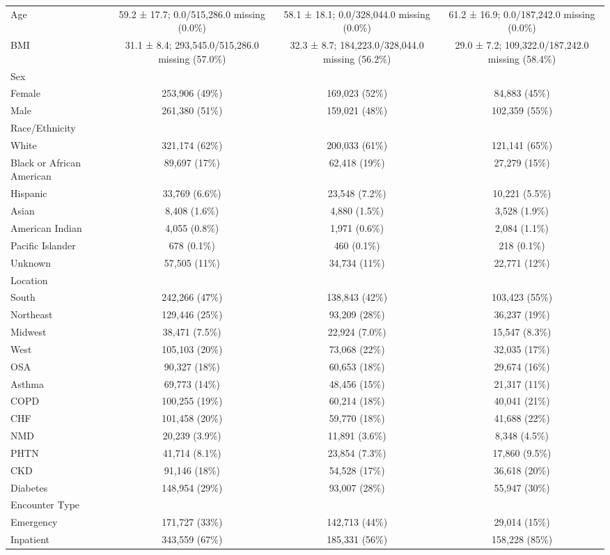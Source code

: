 \documentclass[
  11pt,
  letterpaper,
  DIV=11,
  numbers=noendperiod]{scrartcl}
\begin{document}
\begin{longtable*}{>{\raggedright\arraybackslash}p{2.0in}ccc}
\endfoot
\bottomrule
\endlastfoot
Age & 59.2 ± 17.7; 0.0/515,286.0 missing (0.0\%) & 58.1 ± 18.1; 0.0/328,044.0 missing (0.0\%) & 61.2 ± 16.9; 0.0/187,242.0 missing (0.0\%)\\
BMI & 31.1 ± 8.4; 293,545.0/515,286.0 missing (57.0\%) & 32.3 ± 8.7; 184,223.0/328,044.0 missing (56.2\%) & 29.0 ± 7.2; 109,322.0/187,242.0 missing (58.4\%)\\
Sex &  &  & \\
Female & 253,906 (49\%) & 169,023 (52\%) & 84,883 (45\%)\\
Male & 261,380 (51\%) & 159,021 (48\%) & 102,359 (55\%)\\
\addlinespace
Race/Ethnicity &  &  & \\
White & 321,174 (62\%) & 200,033 (61\%) & 121,141 (65\%)\\
Black or African American & 89,697 (17\%) & 62,418 (19\%) & 27,279 (15\%)\\
Hispanic & 33,769 (6.6\%) & 23,548 (7.2\%) & 10,221 (5.5\%)\\
Asian & 8,408 (1.6\%) & 4,880 (1.5\%) & 3,528 (1.9\%)\\
\addlinespace
American Indian & 4,055 (0.8\%) & 1,971 (0.6\%) & 2,084 (1.1\%)\\
Pacific Islander & 678 (0.1\%) & 460 (0.1\%) & 218 (0.1\%)\\
Unknown & 57,505 (11\%) & 34,734 (11\%) & 22,771 (12\%)\\
Location &  &  & \\
South & 242,266 (47\%) & 138,843 (42\%) & 103,423 (55\%)\\
\addlinespace
Northeast & 129,446 (25\%) & 93,209 (28\%) & 36,237 (19\%)\\
Midwest & 38,471 (7.5\%) & 22,924 (7.0\%) & 15,547 (8.3\%)\\
West & 105,103 (20\%) & 73,068 (22\%) & 32,035 (17\%)\\
OSA & 90,327 (18\%) & 60,653 (18\%) & 29,674 (16\%)\\
Asthma & 69,773 (14\%) & 48,456 (15\%) & 21,317 (11\%)\\
\addlinespace
COPD & 100,255 (19\%) & 60,214 (18\%) & 40,041 (21\%)\\
CHF & 101,458 (20\%) & 59,770 (18\%) & 41,688 (22\%)\\
NMD & 20,239 (3.9\%) & 11,891 (3.6\%) & 8,348 (4.5\%)\\
PHTN & 41,714 (8.1\%) & 23,854 (7.3\%) & 17,860 (9.5\%)\\
CKD & 91,146 (18\%) & 54,528 (17\%) & 36,618 (20\%)\\
\addlinespace
Diabetes & 148,954 (29\%) & 93,007 (28\%) & 55,947 (30\%)\\
Encounter Type &  &  & \\
Emergency & 171,727 (33\%) & 142,713 (44\%) & 29,014 (15\%)\\
Inpatient & 343,559 (67\%) & 185,331 (56\%) & 158,228 (85\%)\\*
\end{longtable*}
\end{document}
